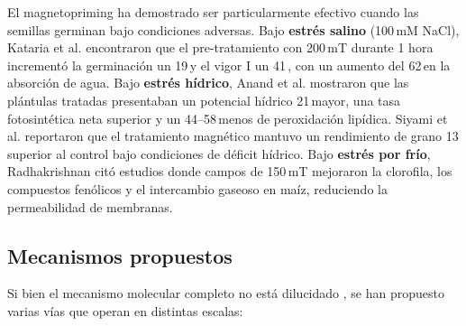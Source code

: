 El magnetopriming ha demostrado ser particularmente efectivo cuando las semillas germinan bajo condiciones adversas. Bajo \textbf{estrés salino} (100\,mM NaCl), Kataria et al. \cite{kataria_2017} encontraron que el pre-tratamiento con 200\,mT durante 1 hora incrementó la germinación un 19\,\pct y el vigor I un 41\,\pct, con un aumento del 62\,\pct en la absorción de agua. Bajo \textbf{estrés hídrico}, Anand et al. \cite{anand_2012} mostraron que las plántulas tratadas presentaban un potencial hídrico 21\,\pct mayor, una tasa fotosintética neta superior y un 44--58\,\pct menos de peroxidación lipídica. Siyami et al. \cite{siyami_2018} reportaron que el tratamiento magnético mantuvo un rendimiento de grano 13\,\pct superior al control bajo condiciones de déficit hídrico. Bajo \textbf{estrés por frío}, Radhakrishnan \cite{radhakrishnan_2019} citó estudios donde campos de 150\,mT mejoraron la clorofila, los compuestos fenólicos y el intercambio gaseoso en maíz, reduciendo la permeabilidad de membranas.

\subsection{Mecanismos propuestos}

Si bien el mecanismo molecular completo no está dilucidado \cite{araujo_2016, maffei_2022}, se han propuesto varias vías que operan en distintas escalas:

